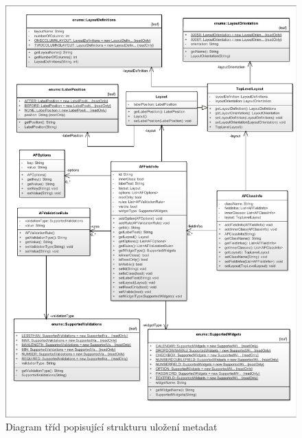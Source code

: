 \begin{figure}
\begin{center}
\includegraphics[width=\textwidth, height=\textheight, keepaspectratio]{figures/metadataClass}
\caption{Diagram tříd popisující strukturu uložení metadat}
\label{img:metadataClass}
\end{center}
\end{figure}

